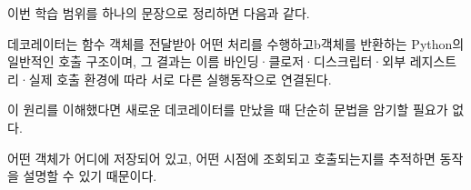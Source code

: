 이번 학습 범위를 하나의 문장으로 정리하면 다음과 같다.

데코레이터는 함수 객체를 전달받아 어떤 처리를 수행하고b객체를 반환하는 Python의 일반적인 호출 구조이며, 그 결과는 이름 바인딩·클로저·디스크립터·외부 레지스트리·실제 호출 환경에 따라 서로 다른 실행동작으로 연결된다.

이 원리를 이해했다면 새로운 데코레이터를 만났을 때 단순히 문법을 암기할 필요가 없다.

어떤 객체가 어디에 저장되어 있고, 어떤 시점에 조회되고 호출되는지를 추적하면 동작을 설명할 수 있기 때문이다.

